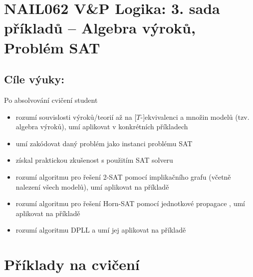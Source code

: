 \section*{NAIL062 V\&P Logika: 3. sada příkladů -- Algebra výroků, Problém SAT}

\subsection*{Cíle výuky:} Po absolvování cvičení student

    \begin{itemize}\setlength{\itemsep}{0pt}
        \item rozumí souvislosti výroků/teorií až na [$T$-]ekvivalenci a množin modelů (tzv. algebra výroků), umí aplikovat v konkrétních příkladech
        \item umí zakódovat daný problém jako instanci problému SAT
        \item získal praktickou zkušenost s použitím SAT solveru
        \item rozumí algoritmu pro řešení 2-SAT pomocí implikačního grafu (včetně nalezení všech modelů), umí aplikovat na příkladě
        \item rozumí algoritmu pro řešení Horn-SAT pomocí jednotkové propagace , umí aplikovat na příkladě
        \item rozumí algoritmu DPLL a umí jej aplikovat na příkladě
    \end{itemize}

\section*{Příklady na cvičení}


